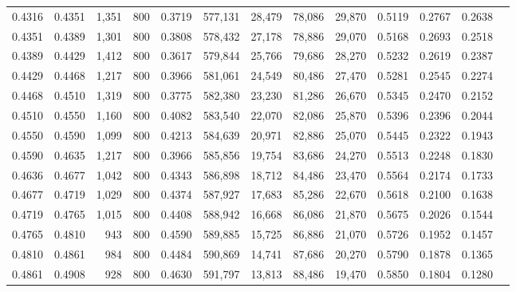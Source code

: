 \begin{tabular}{rrrrrrrrrrrrr}
0.4316 & 0.4351 &  1,351 &   800 &                                     0.3719 & 577,131 &  28,479 &  78,086 &  29,870 & 0.5119 & 0.2767 & 0.2638 \\
0.4351 & 0.4389 &  1,301 &   800 &                                     0.3808 & 578,432 &  27,178 &  78,886 &  29,070 & 0.5168 & 0.2693 & 0.2518 \\
0.4389 & 0.4429 &  1,412 &   800 &                                     0.3617 & 579,844 &  25,766 &  79,686 &  28,270 & 0.5232 & 0.2619 & 0.2387 \\
0.4429 & 0.4468 &  1,217 &   800 &                                     0.3966 & 581,061 &  24,549 &  80,486 &  27,470 & 0.5281 & 0.2545 & 0.2274 \\
0.4468 & 0.4510 &  1,319 &   800 &                                     0.3775 & 582,380 &  23,230 &  81,286 &  26,670 & 0.5345 & 0.2470 & 0.2152 \\
0.4510 & 0.4550 &  1,160 &   800 &                                     0.4082 & 583,540 &  22,070 &  82,086 &  25,870 & 0.5396 & 0.2396 & 0.2044 \\
0.4550 & 0.4590 &  1,099 &   800 &                                     0.4213 & 584,639 &  20,971 &  82,886 &  25,070 & 0.5445 & 0.2322 & 0.1943 \\
0.4590 & 0.4635 &  1,217 &   800 &                                     0.3966 & 585,856 &  19,754 &  83,686 &  24,270 & 0.5513 & 0.2248 & 0.1830 \\
0.4636 & 0.4677 &  1,042 &   800 &                                     0.4343 & 586,898 &  18,712 &  84,486 &  23,470 & 0.5564 & 0.2174 & 0.1733 \\
0.4677 & 0.4719 &  1,029 &   800 &                                     0.4374 & 587,927 &  17,683 &  85,286 &  22,670 & 0.5618 & 0.2100 & 0.1638 \\
0.4719 & 0.4765 &  1,015 &   800 &                                     0.4408 & 588,942 &  16,668 &  86,086 &  21,870 & 0.5675 & 0.2026 & 0.1544 \\
0.4765 & 0.4810 &    943 &   800 &                                     0.4590 & 589,885 &  15,725 &  86,886 &  21,070 & 0.5726 & 0.1952 & 0.1457 \\
0.4810 & 0.4861 &    984 &   800 &                                     0.4484 & 590,869 &  14,741 &  87,686 &  20,270 & 0.5790 & 0.1878 & 0.1365 \\
0.4861 & 0.4908 &    928 &   800 &                                     0.4630 & 591,797 &  13,813 &  88,486 &  19,470 & 0.5850 & 0.1804 & 0.1280 \\

\end{tabular}
